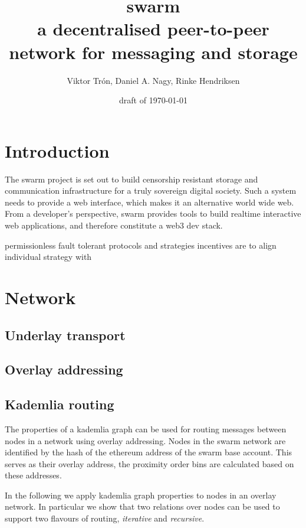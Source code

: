 \documentclass[a4paper,10pt,fullpage]{article}
\title{\Huge swarm\\
\Large a decentralised peer-to-peer network for messaging and
storage}
\author{Viktor Trón, Daniel A. Nagy, Rinke Hendriksen}
\date{draft of \today}
\numberwithin{equation}{section}
\theoremstyle{definition}
\begin{document}
\newcommand\pot[3]{}
\maketitle
\begin{abstract}
          
\end{abstract}
\setcounter{tocdepth}{2}
\tableofcontents

\section{Introduction}

The swarm project is set out to build censorship resistant storage and communication infrastructure for a truly sovereign digital society. Such a system needs  to provide a web interface, which makes it an alternative world wide web.
From a developer's perspective, swarm provides tools to build realtime interactive web applications, and therefore constitute a web3 dev stack.

permissionless fault tolerant 
protocols and strategies
incentives are to align individual strategy with 

\section{Network}
\subsection{Underlay transport}
\subsection{Overlay addressing}

\subsection{Kademlia routing}
\label{sec:kademlia-flavours}

\label{sec:kademlia} 

The properties of a kademlia graph can be used for routing messages between nodes in a network using overlay addressing. Nodes in the swarm network are identified by the hash of the ethereum address of the swarm base account. This serves as their overlay address, the proximity order bins are calculated based on these addresses. 

In the following we apply kademlia graph properties to nodes in an overlay network. In particular we show that two relations over nodes can be used to support two flavours of routing, \emph{iterative} and \emph{recursive}.
\end{document}

